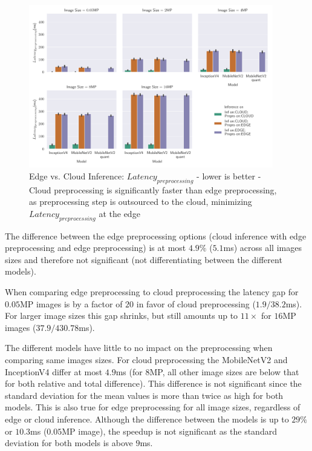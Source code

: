 \begin{figure}[!htb]
\centering
\includegraphics[width=0.95\textwidth]{./Bilder/single_plots/edge_vs_cloud_plots/Edge_vs_Cloud_Inference_Preprocessing_Latencies.pdf}
\caption[Edge vs. Cloud Inference:  $Latency_{preprocessing}$ - lower is better]{Edge vs. Cloud Inference:  $Latency_{preprocessing}$ - lower is better - Cloud preprocessing is significantly faster than edge preprocessing, as preprocessing step is outsourced to the cloud, minimizing $Latency_{preprocessing}$ at the edge}
\label{fig:EdgeVsCloudPreproLat}
\end{figure}

The difference between the edge preprocessing options (cloud inference with edge preprocessing and edge preprocessing) is at most $4.9\%$ ($5.1$ms) across all images sizes and therefore not significant (not differentiating between the different models).

When comparing edge preprocessing to cloud preprocessing the latency gap for $0.05$MP images is by a factor of $20$ in favor of cloud preprocessing ($1.9/38.2$ms). For larger image sizes this gap shrinks, but still amounts up to  $11\times$ for $16$MP images ($37.9/430.78$ms).

The different models have little to no impact on the preprocessing when comparing same images sizes.
For cloud preprocessing the MobileNetV2 and InceptionV4 differ at most $4.9$ms (for $8$MP, all other image sizes are below that for both relative and total difference). This difference is not significant since the standard deviation for the mean values is more than twice as high for both models.
This is also true for edge preprocessing for all image sizes, regardless of edge or cloud inference.
Although the difference between the models is up to $29\%$ or $10.3$ms ($0.05$MP image), the speedup is not significant as the standard deviation for both models is above $9$ms.

